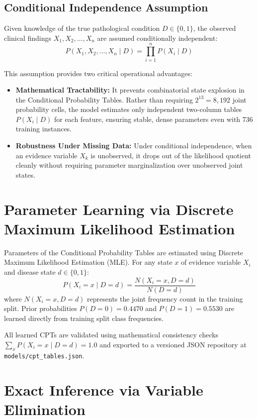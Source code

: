 \documentclass[12pt,a4paper]{report}
\begin{document}
\subsection{Conditional Independence Assumption}
Given knowledge of the true pathological condition $D \in \{0, 1\}$, the observed clinical findings $X_1, X_2, \dots, X_n$ are assumed conditionally independent:
\begin{equation}
P(X_1, X_2, \dots, X_n \mid D) = \prod_{i=1}^n P(X_i \mid D)
\end{equation}

This assumption provides two critical operational advantages:
\begin{itemize}
\item \textbf{Mathematical Tractability:} It prevents combinatorial state explosion in the Conditional Probability Tables. Rather than requiring $2^{13} = 8,192$ joint probability cells, the model estimates only independent two-column tables $P(X_i \mid D)$ for each feature, ensuring stable, dense parameters even with 736 training instances.
\item \textbf{Robustness Under Missing Data:} Under conditional independence, when an evidence variable $X_k$ is unobserved, it drops out of the likelihood quotient cleanly without requiring parameter marginalization over unobserved joint states.
\end{itemize}

\section{Parameter Learning via Discrete Maximum Likelihood Estimation}

Parameters of the Conditional Probability Tables are estimated using Discrete Maximum Likelihood Estimation (MLE). For any state $x$ of evidence variable $X_i$ and disease state $d \in \{0, 1\}$:
\begin{equation}
P(X_i = x \mid D = d) = \frac{N(X_i = x, D = d)}{N(D = d)}
\end{equation}
where $N(X_i = x, D = d)$ represents the joint frequency count in the training split. Prior probabilities $P(D = 0) = 0.4470$ and $P(D = 1) = 0.5530$ are learned directly from training split class frequencies.

All learned CPTs are validated using mathematical consistency checks $\sum_x P(X_i = x \mid D = d) = 1.0$ and exported to a versioned JSON repository at \texttt{models/cpt\_tables.json}.

\section{Exact Inference via Variable Elimination}
\end{document}
